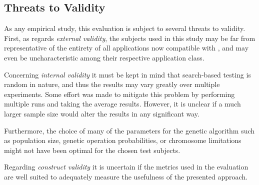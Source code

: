 \subsection{Threats to Validity}
As any empirical study, this evaluation is subject to several threats to validity.
First, as regards \emph{external validity}, the subjects used in this study may be far from representative of
the entirety of all applications now compatible with \xmlmate, and may even be uncharacteristic among their
respective application class.

Concerning \emph{internal validity} it must be kept in mind that search-based testing is random in nature, and
thus the results may vary greatly over multiple experiments. Some effort was made to mitigate this problem by
performing multiple runs and taking the average results. However, it is unclear if a much larger sample size
would alter the results in any significant way.

Furthermore, the choice of many of the parameters for the genetic algorithm such as population size,
genetic operation probabilities, or chromosome limitations might not have been optimal for the chosen test
subjects.

Regarding \emph{construct validity} it is uncertain if the metrics used in the evaluation are well suited
to adequately measure the usefulness of the presented approach.
 
